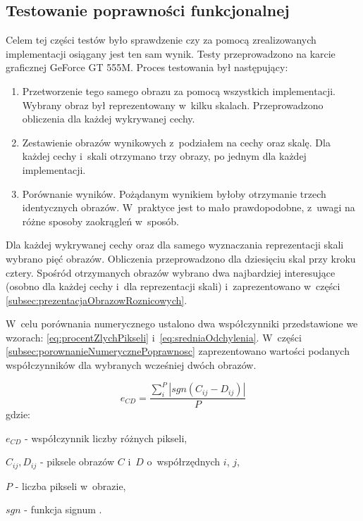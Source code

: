 \subsection{Testowanie poprawności funkcjonalnej}
\label{sec:testPoprawnosc}

Celem tej części testów było sprawdzenie czy za pomocą zrealizowanych implementacji osiągany jest ten sam wynik. Testy przeprowadzono na karcie graficznej GeForce GT 555M. Proces testowania był następujący:

\begin{enumerate}
\item Przetworzenie tego samego obrazu za pomocą wszystkich implementacji. Wybrany obraz był reprezentowany w~kilku skalach. Przeprowadzono obliczenia dla każdej wykrywanej cechy.
\item Zestawienie obrazów wynikowych z~podziałem na cechy oraz skalę. Dla każdej cechy i~skali otrzymano trzy obrazy, po jednym dla każdej implementacji.
\item Porównanie wyników. Pożądanym wynikiem byłoby otrzymanie trzech identycznych obrazów. W~praktyce jest to mało prawdopodobne, z~uwagi na różne sposoby zaokrągleń w~sposób.
\end{enumerate}

Dla każdej wykrywanej cechy oraz dla samego wyznaczania reprezentacji skali wybrano pięć obrazów. Obliczenia przeprowadzono dla dziesięciu skal przy kroku cztery. Spośród otrzymanych obrazów wybrano dwa najbardziej interesujące (osobno dla każdej cechy i~dla reprezentacji skali) i~zaprezentowano w~części \ref{subsec:prezentacjaObrazowRoznicowych}.

W~celu porównania numerycznego ustalono dwa współczynniki przedstawione we wzorach: \eqref{eq:procentZlychPikseli} i~\eqref{eq:sredniaOdchylenia}. W~części \ref{subsec:porownanieNumerycznePoprawnosc} zaprezentowano wartości podanych współczynników dla wybranych wcześniej dwóch obrazów.

\begin{equation}
\label{eq:procentZlychPikseli}
e_{CD} = \frac{\sum_{i}^{P}|sgn(C_{ij}-D_{ij})	|}{P}
\end{equation}
gdzie:

$ e_{CD} $ - współczynnik liczby różnych pikseli,

$ C_{ij}, D_{ij} $ - piksele obrazów $ C $ i~$ D $ o~współrzędnych $i$, $j$,

$ P $ - liczba pikseli w~obrazie,

$ sgn $ - funkcja signum \cite{Signum}.

